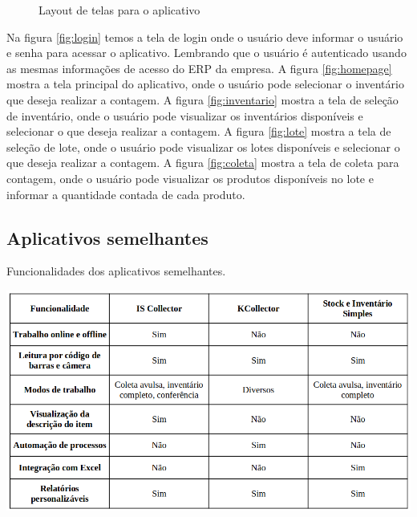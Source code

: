 \begin{figure}[H]
{    }
    \quad
    \label{fig:grupo01}
    \caption{Layout de telas para o aplicativo}
\end{figure}

Na figura \ref{fig:login} temos a tela de login onde o usuário deve informar o usuário e senha para acessar o aplicativo. Lembrando que o usuário é autenticado usando as mesmas informações de acesso do ERP da empresa. A figura \ref{fig:homepage} mostra a tela principal do aplicativo, onde o usuário pode selecionar o inventário que deseja realizar a contagem. A figura \ref{fig:inventario} mostra a tela de seleção de inventário, onde o usuário pode visualizar os inventários disponíveis e selecionar o que deseja realizar a contagem. A figura \ref{fig:lote} mostra a tela de seleção de lote, onde o usuário pode visualizar os lotes disponíveis e selecionar o que deseja realizar a contagem. A figura \ref{fig:coleta} mostra a tela de coleta para contagem, onde o usuário pode visualizar os produtos disponíveis no lote e informar a quantidade contada de cada produto.

\subsection{Aplicativos semelhantes}

\begin{table}[H]
    \centering
    \caption{Funcionalidades dos aplicativos semelhantes.}
    \label{tab:comparativos}
    \includegraphics[width=1.0\textwidth]{tables/comparativo.png}
\end{table}


